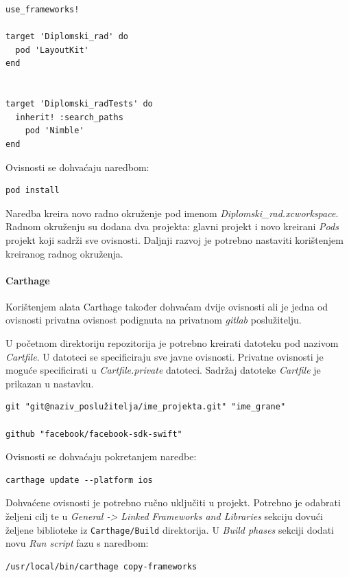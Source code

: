 \documentclass[times, utf8, diplomski, numeric]{fer}
\begin{document}
\begin{appendices}
\begin{verbatim}
use_frameworks!

target 'Diplomski_rad' do
  pod 'LayoutKit'
end


target 'Diplomski_radTests' do
  inherit! :search_paths
    pod 'Nimble'
end
\end{verbatim}

Ovisnosti se dohvaćaju naredbom:

\begin{verbatim}
pod install
\end{verbatim}

Naredba kreira novo radno okruženje pod imenom \textit{Diplomski\_rad.xcworkspace}. Radnom okruženju su dodana dva projekta: glavni projekt i novo kreirani \textit{Pods} projekt koji sadrži sve ovisnosti. Daljnji razvoj je potrebno nastaviti korištenjem kreiranog radnog okruženja.

\paragraph{Carthage}

Korištenjem alata Carthage također dohvaćam dvije ovisnosti ali je jedna od ovisnosti privatna ovisnost podignuta na privatnom \textit{gitlab} poslužitelju.

U početnom direktoriju repozitorija je potrebno kreirati datoteku pod nazivom \textit{Cartfile}. U datoteci se specificiraju sve javne ovisnosti. Privatne ovisnosti je moguće specificirati u \textit{Cartfile.private} datoteci. Sadržaj datoteke \textit{Cartfile} je prikazan u nastavku.

\begin{verbatim}
git "git@naziv_poslužitelja/ime_projekta.git" "ime_grane"

github "facebook/facebook-sdk-swift"
\end{verbatim}

Ovisnosti se dohvaćaju pokretanjem naredbe:

\begin{verbatim}
carthage update --platform ios
\end{verbatim}

Dohvaćene ovisnosti je potrebno ručno uključiti u projekt. Potrebno je odabrati željeni cilj te u \textit{General -> Linked Frameworks and Libraries} sekciju dovući željene biblioteke iz \verb|Carthage/Build| direktorija. U \textit{Build phases} sekciji dodati novu \textit{Run script} fazu s naredbom:

\begin{verbatim}
/usr/local/bin/carthage copy-frameworks
\end{verbatim}


\end{appendices}
\end{document}
